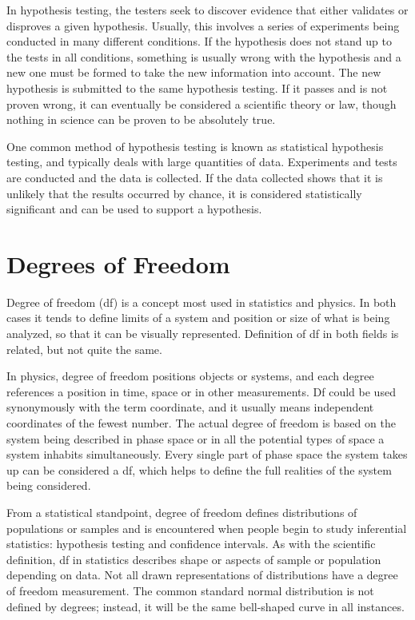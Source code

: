  

In hypothesis testing, the testers seek to discover evidence that either validates or disproves a given hypothesis. Usually, this involves a series of experiments being conducted in many different conditions. If the hypothesis does not stand up to the tests in all conditions, something is usually wrong with the hypothesis and a new one must be formed to take the new information into account. The new hypothesis is submitted to the same hypothesis testing. If it passes and is not proven wrong, it can eventually be considered a scientific theory or law, though nothing in science can be proven to be absolutely true.

 

One common method of hypothesis testing is known as statistical hypothesis testing, and typically deals with large quantities of data. Experiments and tests are conducted and the data is collected. If the data collected shows that it is unlikely that the results occurred by chance, it is considered statistically significant and can be used to support a hypothesis.

 



\section{Degrees of Freedom}

 

Degree of freedom (df) is a concept most used in statistics and physics. In both cases it tends to define limits of a system and position or size of what is being analyzed, so that it can be visually represented. Definition of df in both fields is related, but not quite the same.

 

In physics, degree of freedom positions objects or systems, and each degree references a position in time, space or in other measurements. Df could be used synonymously with the term coordinate, and it usually means independent coordinates of the fewest number. The actual degree of freedom is based on the system being described in phase space or in all the potential types of space a system inhabits simultaneously. Every single part of phase space the system takes up can be considered a df, which helps to define the full realities of the system being considered.

 

From a statistical standpoint, degree of freedom defines distributions of populations or samples and is encountered when people begin to study inferential statistics: hypothesis testing and confidence intervals. As with the scientific definition, df in statistics describes shape or aspects of sample or population depending on data. Not all drawn representations of distributions have a degree of freedom measurement. The common standard normal distribution is not defined by degrees; instead, it will be the same bell-shaped curve in all instances.

